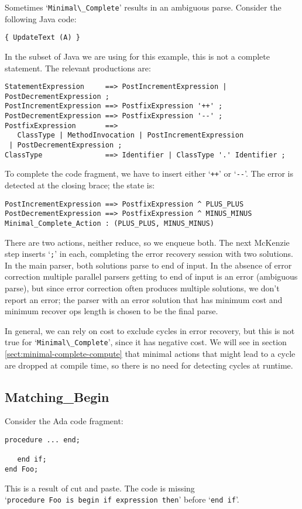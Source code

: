\documentclass[authordraft]{acmart}
\newcommand{\code}[1]{`\lstinline|#1|'}
\begin{document}
Sometimes \code{Minimal\_Complete} results in an ambiguous
parse. Consider the following Java code:
\begin{lstlisting}
{ UpdateText (A) }
\end{lstlisting}
In the subset of Java we are using for this example, this is not a
complete statement. The relevant productions are:
\begin{verbatim}
StatementExpression     ==> PostIncrementExpression | PostDecrementExpression ;
PostIncrementExpression ==> PostfixExpression '++' ;
PostDecrementExpression ==> PostfixExpression '--' ;
PostfixExpression       ==>
   ClassType | MethodInvocation | PostIncrementExpression
 | PostDecrementExpression ;
ClassType               ==> Identifier | ClassType '.' Identifier ;
\end{verbatim}
To complete the code fragment, we have to insert either
\code{++} or \code{--}. The error is detected at the closing brace;
the state is:
\begin{verbatim}
PostIncrementExpression ==> PostfixExpression ^ PLUS_PLUS
PostDecrementExpression ==> PostfixExpression ^ MINUS_MINUS
Minimal_Complete_Action : (PLUS_PLUS, MINUS_MINUS)
\end{verbatim}
There are two actions, neither reduce, so we enqueue both. The next
McKenzie step inserts \code{;} in each, completing the error recovery
session with two solutions. In the main parser, both solutions parse
to end of input. In the absence of error correction multiple parallel
parsers getting to end of input is an error (ambiguous parse), but
since error correction often produces multiple solutions, we don't
report an error; the parser with an error solution that has minimum
cost and minimum recover ops length is chosen to be the final parse.

In general, we can rely on cost to exclude cycles in error recovery,
but this is not true for \code{Minimal\_Complete}, since it has
negative cost. We will see in section \ref{sect:minimal-complete-compute}
that minimal actions that might lead to a cycle are dropped at
compile time, so there is no need for detecting cycles at runtime.

\subsection{Matching\_Begin}
Consider the Ada code fragment:
\begin{lstlisting}
procedure ... end;

   end if;
end Foo;
\end{lstlisting}
This is a result of cut and paste. The code is missing
\\ \code{procedure Foo is begin if expression then} before
\code{end if}.
\end{document}
